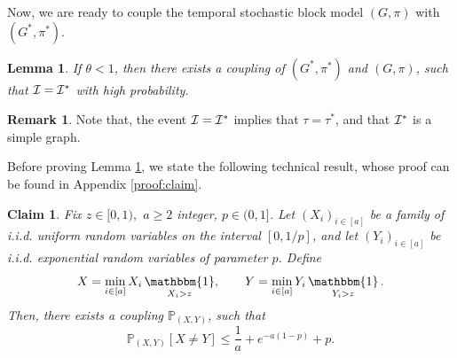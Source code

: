 \documentclass[11pt]{article}
\numberwithin{equation}{section}
\DeclareMathOperator{\indicatrice}{\mathbbm{1}}
\newtheorem{lemma}[theorem]{Lemma}
\newtheorem{claim}[theorem]{Claim}
\theoremstyle{definition}
\newtheorem{remark}[theorem]{Remark}
\newcommand\bP{{\mathbb P}}
\newcommand\cI{{\cal{I}}}
\begin{document}
Now, we are ready to couple the temporal stochastic block model $(G,\pi)$ with $(G^*,\pi^*)$. 

\begin{lemma}
\label{lemma:coupling_G}
If $\theta<1$, then there exists a coupling of $(G^*,\pi^*)$ and $(G,\pi)$, such that $\cI = \cI^*$ with high probability.
\end{lemma}

\begin{remark}\label{result:multiTSBM} Note that, the event $\cI = \cI^*$ implies that $\tau = \tau^*$, and that $\cI^*$ is a simple graph. 
\end{remark}

Before proving Lemma \ref{lemma:coupling_G}, we state the following technical result, whose proof can be found in Appendix \ref{proof:claim}.

\begin{claim}
\label{claim:calcul_Y}
Fix $z \in [0,1),$ $a\geq 2$ integer, $p \in (0,1]$. Let $(X_i)_{i\in [a]}$ be a family of i.i.d. uniform random variables on the interval $[0,1/p]$, and let $(Y_i)_{i \in [a]}$ be i.i.d. exponential random variables of parameter $p$. Define
\begin{equation*}
X = \min_{i\in [a]}X_i \indicatrice_{X_i > z}  , \quad \quad Y = \min_{i\in [a]}Y_i \indicatrice_{Y_i > z}.
\end{equation*}
Then, there exists a coupling $\bP_{(X,Y)}$, such that
$$\bP_{(X,Y)}[X\neq Y] \leq \frac{1}{a} + e^{-a(1-p)} + p. $$	
\end{claim}
\end{document}
